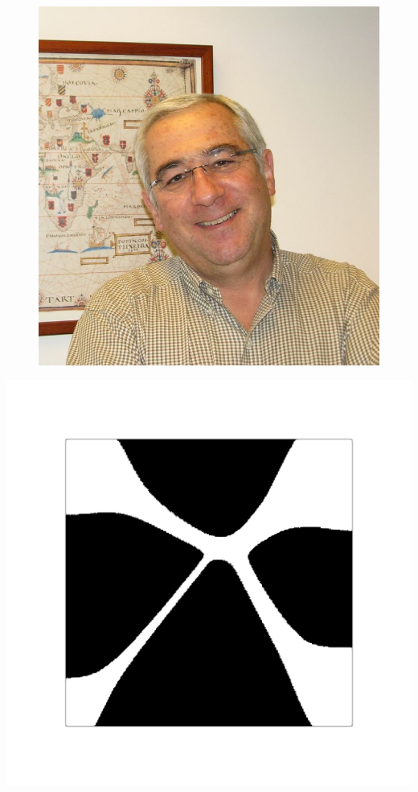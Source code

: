 \documentclass[aspectratio=169,xcolor=dvipsnames,11pt]{beamer}
\begin{document}
\begin{frame}
\begin{minipage}{0.3\linewidth}
\begin{figure}
  \hfill
  \begin{minipage}[b]{0.46\textwidth}
    \includegraphics[width=\linewidth]{figures/Rodrigues.jpg}
  \end{minipage}
\end{figure}
 \begin{minipage}[b]{0.5\textwidth}
    \includegraphics[width=\linewidth]{figures/global_feasible_active_set.png}

\end{minipage}
\end{minipage}
\end{frame}
\end{document}
